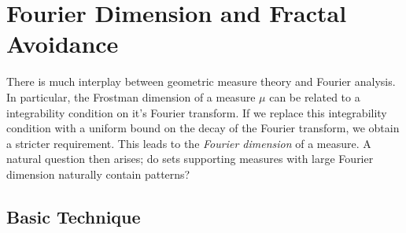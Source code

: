 
\chapter{Fourier Dimension and Fractal Avoidance}
\label{ch:FourierDimension}

There is much interplay between geometric measure theory and Fourier analysis. In particular, the Frostman dimension of a measure $\mu$ can be related to a integrability condition on it's Fourier transform. If we replace this integrability condition with a uniform bound on the decay of the Fourier transform, we obtain a stricter requirement. This leads to the \emph{Fourier dimension} of a measure. A natural question then arises; do sets supporting measures with large Fourier dimension naturally contain patterns?

\section{Basic Technique}

